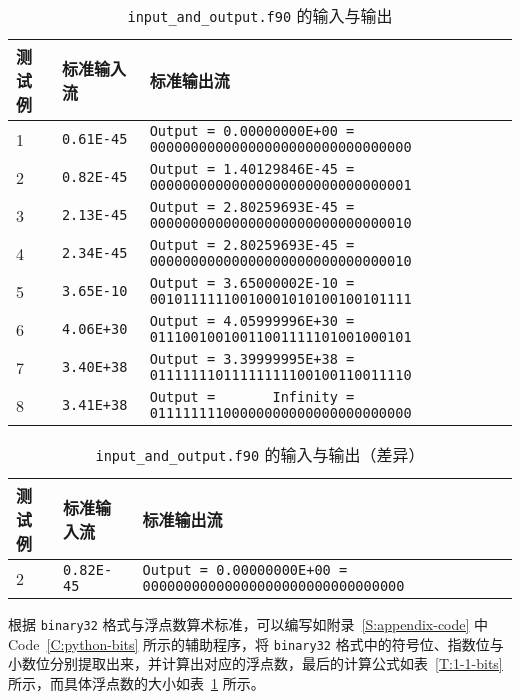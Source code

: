 \begin{table}[H]
    \caption{\texttt{input\_and\_output.f90} 的输入与输出}\label{T:1-1-input_and_output}
    \centering
    \begin{tabular}{lll}
        \toprule
        测试例 & 标准输入流 & 标准输出流 \\ \midrule
        \rowcolor[HTML]{EFEFEF}
        1 & \verb|0.61E-45| & \verb|Output = 0.00000000E+00 = 00000000000000000000000000000000| \\
        2 & \verb|0.82E-45| & \verb|Output = 1.40129846E-45 = 00000000000000000000000000000001| \\
        \rowcolor[HTML]{EFEFEF}
        3 & \verb|2.13E-45| & \verb|Output = 2.80259693E-45 = 00000000000000000000000000000010| \\
        4 & \verb|2.34E-45| & \verb|Output = 2.80259693E-45 = 00000000000000000000000000000010| \\
        \rowcolor[HTML]{EFEFEF}
        5 & \verb|3.65E-10| & \verb|Output = 3.65000002E-10 = 00101111110010001010100100101111| \\
        6 & \verb|4.06E+30| & \verb|Output = 4.05999996E+30 = 01110010010011001111101001000101| \\
        \rowcolor[HTML]{EFEFEF}
        7 & \verb|3.40E+38| & \verb|Output = 3.39999995E+38 = 01111111011111111100100110011110| \\
        8 & \verb|3.41E+38| & \verb|Output =       Infinity = 01111111100000000000000000000000| \\ \bottomrule
    \end{tabular}
\end{table}

\begin{table}[H]
    \caption{\texttt{input\_and\_output.f90} 的输入与输出（差异）}\label{T:1-1-input_and_output_diff}
    \centering
    \begin{tabular}{lll}
        \toprule
        测试例 & 标准输入流 & 标准输出流 \\ \midrule
        \rowcolor[HTML]{EFEFEF}
        2 & \verb|0.82E-45| & \verb|Output = 0.00000000E+00 = 00000000000000000000000000000000| \\ \bottomrule
    \end{tabular}
\end{table}

根据 \texttt{binary32} 格式与浮点数算术标准\cite{wiki:single-precision_floating-point}，可以编写如附录~\ref{S:appendix-code} 中 Code~\ref{C:python-bits} 所示的辅助程序，将 \texttt{binary32} 格式中的符号位、指数位与小数位分别提取出来，并计算出对应的浮点数，最后的计算公式如表~\ref{T:1-1-bits} 所示，而具体浮点数的大小如表~\ref{T:1-1-input_and_output} 所示。

